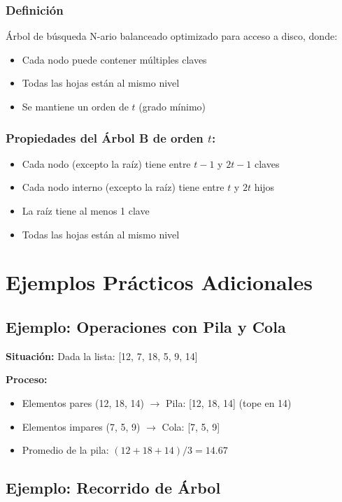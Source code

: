 \documentclass[12pt,a4paper]{article}
\begin{document}
\subsubsection{Definición}
Árbol de búsqueda N-ario balanceado optimizado para acceso a disco, donde:
\begin{itemize}
    \item Cada nodo puede contener múltiples claves
    \item Todas las hojas están al mismo nivel
    \item Se mantiene un orden de $t$ (grado mínimo)
\end{itemize}

\subsubsection{Propiedades del Árbol B de orden $t$:}
\begin{itemize}
    \item Cada nodo (excepto la raíz) tiene entre $t-1$ y $2t-1$ claves
    \item Cada nodo interno (excepto la raíz) tiene entre $t$ y $2t$ hijos
    \item La raíz tiene al menos 1 clave
    \item Todas las hojas están al mismo nivel
\end{itemize}

\newpage

\section{Ejemplos Prácticos Adicionales}

\subsection{Ejemplo: Operaciones con Pila y Cola}

\textbf{Situación:} Dada la lista: [12, 7, 18, 5, 9, 14]

\textbf{Proceso:}
\begin{itemize}
    \item Elementos pares (12, 18, 14) $\rightarrow$ Pila: [12, 18, 14] (tope en 14)
    \item Elementos impares (7, 5, 9) $\rightarrow$ Cola: [7, 5, 9]
    \item Promedio de la pila: $(12 + 18 + 14) / 3 = 14.67$
\end{itemize}

\subsection{Ejemplo: Recorrido de Árbol}
\end{document}

